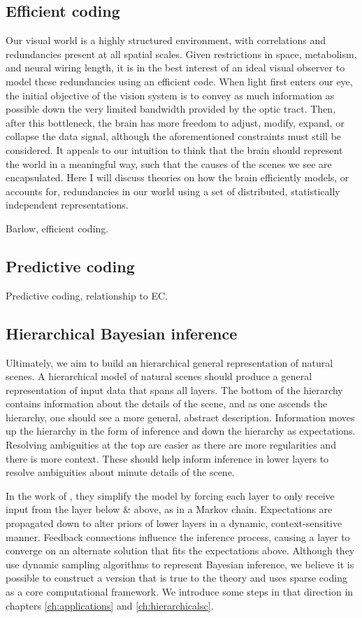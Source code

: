 \subsection{Efficient coding}
Our visual world is a highly structured environment, with correlations and redundancies present at all spatial scales. Given restrictions in space, metabolism, and neural wiring length, it is in the best interest of an ideal visual observer to model these redundancies using an efficient code. When light first enters our eye, the initial objective of the vision system is to convey as much information as possible down the very limited bandwidth provided by the optic tract. Then, after this bottleneck, the brain has more freedom to adjust, modify, expand, or collapse the data signal, although the aforementioned constraints must still be considered. It appeals to our intuition to think that the brain should represent the world in a meaningful way, such that the causes of the scenes we see are encapsulated. Here I will discuss theories on how the brain efficiently models, or accounts for, redundancies in our world using a set of distributed, statistically independent representations.

Barlow, efficient coding.


\subsection{Predictive coding}
Predictive coding, relationship to EC.


\subsection{Hierarchical Bayesian inference}
Ultimately, we aim to build an hierarchical general representation of natural scenes. A hierarchical model of natural scenes should produce a general representation of input data that spans all layers. The bottom of the hierarchy contains information about the details of the scene, and as one ascends the hierarchy, one should see a more general, abstract description. Information moves up the hierarchy in the form of inference and down the hierarchy as expectations. Resolving ambiguities at the top are easier as there are more regularities and there is more context. These should help inform inference in lower layers to resolve ambiguities about minute details of the scene.

In the work of \citet{lee2003hierarchical}, they simplify the model by forcing each layer to only receive input from the layer below & above, as in a Markov chain. Expectations are propagated down to alter priors of lower layers in a dynamic, context-sensitive manner. Feedback connections influence the inference process, causing a layer to converge on an alternate solution that fits the expectations above. Although they use dynamic sampling algorithms to represent Bayesian inference, we believe it is possible to construct a version that is true to the theory and uses sparse coding as a core computational framework. We introduce some steps in that direction in chapters \ref{ch:applications} and \ref{ch:hierarchicalsc}.


